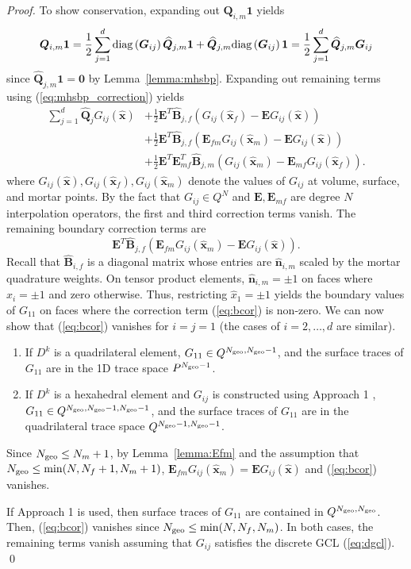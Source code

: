 \documentclass{svjour3}                     %
\renewcommand{\hat}{\widehat}
\newcommand{\diag}[1]{{\rm diag}\LRp{#1}}
\newcommand{\LRp}[1]{\left( #1 \right)}
\begin{document}
\begin{proof}
To show conservation, expanding out $\bm{Q}_{i,m}\bm{1} $ yields
\[
\bm{Q}_{i,m}\bm{1} = \frac{1}{2}\sum_{j=1}^d \diag{\bm{G}_{ij}}\hat{\bm{Q}}_{j,m}\bm{1} + \hat{\bm{Q}}_{j,m} \diag{\bm{G}_{ij}}\bm{1} = \frac{1}{2}\sum_{j=1}^d\hat{\bm{Q}}_{j,m} \bm{G}_{ij}
\]
since $\hat{\bm{Q}}_{j,m}\bm{1} = \bm{0}$ by Lemma~\ref{lemma:mhsbp}.  Expanding out remaining terms using (\ref{eq:mhsbp_correction}) yields
\begin{align*}
\sum_{j=1}^d \hat{\bm{Q}}_j G_{ij}(\hat{\bm{x}}) &+ \frac{1}{2} \bm{E}^T\hat{\bm{B}}_{j,f}\LRp{G_{ij}(\hat{\bm{x}}_f) - \bm{E}G_{ij}(\hat{\bm{x}})} \\
&+ \frac{1}{2} \bm{E}^T\hat{\bm{B}}_{j,f}\LRp{\bm{E}_{fm}G_{ij}(\hat{\bm{x}}_m) - \bm{E}G_{ij}(\hat{\bm{x}})} \\
&+ \frac{1}{2} \bm{E}^T\bm{E}_{mf}^T\hat{\bm{B}}_{j,m}\LRp{G_{ij}(\hat{\bm{x}}_m) - \bm{E}_{mf}G_{ij}(\hat{\bm{x}}_f)}.
\end{align*}
where $G_{ij}(\hat{\bm{x}}), G_{ij}(\hat{\bm{x}}_f), G_{ij}(\hat{\bm{x}}_m)$ denote the values of $G_{ij}$ at volume, surface, and mortar points.  By the fact that $G_{ij} \in Q^N$ and $\bm{E}, \bm{E}_{mf}$ are degree $N$ interpolation operators, the first and third correction terms vanish.  The remaining boundary correction terms are
\begin{equation}
\bm{E}^T\hat{\bm{B}}_{j,f}\LRp{\bm{E}_{fm}G_{ij}(\hat{\bm{x}}_m) - \bm{E}G_{ij}(\hat{\bm{x}})}.  
\label{eq:bcor}
\end{equation}
Recall that $\hat{\bm{B}}_{i,f}$ is a diagonal matrix whose entries are $\hat{\bm{n}}_{i,m}$ scaled by the mortar quadrature weights.  On tensor product elements, $\hat{\bm{n}}_{i,m}=\pm 1$ on faces where $\hat{x}_i = \pm 1$ and zero otherwise.  Thus, restricting $\hat{x}_1 = \pm 1$ yields the boundary values of $G_{11}$ on faces where the correction term (\ref{eq:bcor}) is non-zero.  We can now show that (\ref{eq:bcor}) vanishes for $i = j = 1$ (the cases of $i = 2,\ldots,d$ are similar).  
\begin{enumerate}
\item If $D^k$ is a quadrilateral element, $G_{11} \in Q^{N_{\rm geo},N_{\rm geo}-1}$, and the surface traces of $G_{11}$ are in the 1D trace space $P^{N_{\rm geo}-1}$.  
\item If $D^k$ is a hexahedral element and $G_{ij}$ is constructed using Approach 1 \cite{kozdon2018energy}, $G_{11} \in Q^{N_{\rm geo}, N_{\rm geo}-1,N_{\rm geo}-1}$, and the surface traces of $G_{11}$ are in the quadrilateral trace space $Q^{N_{\rm geo}-1,N_{\rm geo}-1}$.  
\end{enumerate}
Since $N_{\rm geo} \leq N_m+1$, by Lemma~\ref{lemma:Efm} and the assumption that $N_{\rm geo} \leq \min(N, N_f+1, N_m+1)$, $\bm{E}_{fm}G_{ij}(\hat{\bm{x}}_m) = \bm{E}G_{ij}(\hat{\bm{x}})$ and (\ref{eq:bcor}) vanishes.  

If Approach 1 \cite{kopriva2006metric} is used, then surface traces of $G_{11}$ are contained in $Q^{N_{\rm geo},N_{\rm geo}}$.  Then, (\ref{eq:bcor}) vanishes since $N_{\rm geo} \leq \min(N,N_f,N_m)$.  In both cases, the remaining terms vanish assuming that $G_{ij}$ satisfies the discrete GCL (\ref{eq:dgcl}).
\qed\end{proof}
\end{document}
